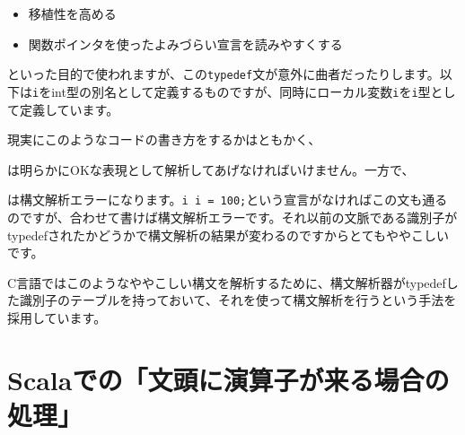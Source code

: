 \begin{itemize}
\tightlist
\item
  移植性を高める
\item
  関数ポインタを使ったよみづらい宣言を読みやすくする
\end{itemize}

といった目的で使われますが、この\texttt{typedef}文が意外に曲者だったりします。以下は\texttt{i}をint型の別名として定義するものですが、同時にローカル変数\texttt{i}を\texttt{i}型として定義しています。

\begin{Shaded}
\begin{Highlighting}[]
 
\NormalTok{) \{}
\NormalTok{; }
        \NormalTok{; }
         \NormalTok{;}
\NormalTok{\}}
\end{Highlighting}
\end{Shaded}

現実にこのようなコードの書き方をするかはともかく、

\begin{Shaded}
\begin{Highlighting}[]
\NormalTok{;}
\end{Highlighting}
\end{Shaded}

は明らかにOKな表現として解析してあげなければいけません。一方で、

\begin{Shaded}
\begin{Highlighting}[]
\NormalTok{;}
\end{Highlighting}
\end{Shaded}

は構文解析エラーになります。\texttt{i\ i\ =\ 100;}という宣言がなければこの文も通るのですが、合わせて書けば構文解析エラーです。それ以前の文脈である識別子がtypedefされたかどうかで構文解析の結果が変わるのですからとてもややこしいです。

C言語ではこのようなややこしい構文を解析するために、構文解析器がtypedefした識別子のテーブルを持っておいて、それを使って構文解析を行うという手法を採用しています。

\hypertarget{chapter7-scalaux3067ux306eux6587ux982dux306bux6f14ux7b97ux5b50ux304cux6765ux308bux5834ux5408ux306eux51e6ux7406}{%
\section{Scalaでの「文頭に演算子が来る場合の処理」}\label{chapter7-scalaux3067ux306eux6587ux982dux306bux6f14ux7b97ux5b50ux304cux6765ux308bux5834ux5408ux306eux51e6ux7406}}

